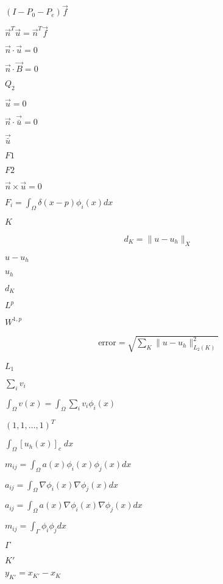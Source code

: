 \documentclass{article}
\begin{document}
$(I-P_0-P_e)\vec{f}$
\pagebreak

$\vec{n}^T\vec{u}=\vec{n}^T\vec{f}$
\pagebreak

$\vec n \cdot \vec u=0$
\pagebreak

$\vec n\cdot \vec B=0$
\pagebreak

$Q_2$
\pagebreak

$\vec u=0$
\pagebreak

$\vec n \cdot \vec {\bar u}=0$
\pagebreak

$\vec {\bar u}$
\pagebreak

$F1$
\pagebreak

$F2$
\pagebreak

$\vec n \times \vec u=0$
\pagebreak

$F_i = \int_\Omega \delta(x-p) \phi_i(x) dx$
\pagebreak

$K$
\pagebreak

\begin{align*} d_K = \| u-u_h \|_X \end{align*}
\pagebreak

$u-u_h$
\pagebreak

$u_h$
\pagebreak

$d_K$
\pagebreak

$L^p$
\pagebreak

$W^{1,p}$
\pagebreak

\begin{align*} \textrm{error} = \sqrt{\sum_K \|u-u_h\|_{L_2(K)}^2} \end{align*}
\pagebreak

$L_1$
\pagebreak

$\sum_i v_i$
\pagebreak

$\int_\Omega v(x) = \int_\Omega \sum_i v_i \phi_i(x)$
\pagebreak

$(1,1,\ldots,1)^T$
\pagebreak

$\int_\Omega [u_h(x)]_c \; dx$
\pagebreak

$m_{ij} = \int_\Omega a(x) \phi_i(x) \phi_j(x) dx$
\pagebreak

$a_{ij} = \int_\Omega \nabla\phi_i(x) \nabla\phi_j(x) dx$
\pagebreak

$a_{ij} = \int_\Omega a(x) \nabla\phi_i(x) \nabla\phi_j(x) dx$
\pagebreak

$m_{ij} = \int_{\Gamma} \phi_i \phi_j dx$
\pagebreak

$\Gamma$
\pagebreak

$K'$
\pagebreak

$y_{K'}=x_{K'}-x_K$
\pagebreak
\end{document}
